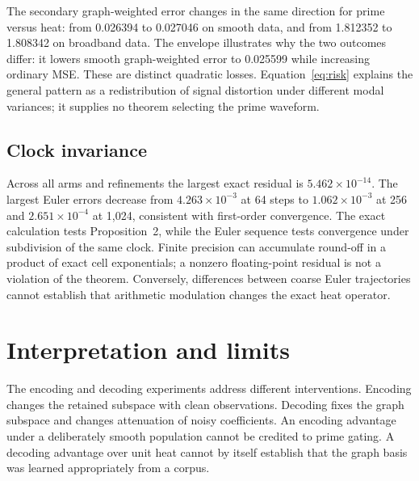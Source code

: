 \documentclass[10pt]{article}
\begin{document}
The secondary graph-weighted error changes in the same direction
for prime versus heat: from 0.026394 to 0.027046 on smooth data,
and from 1.812352 to 1.808342 on broadband data. The envelope illustrates
why the two outcomes differ: it lowers smooth graph-weighted error
to 0.025599 while increasing ordinary MSE. These are distinct quadratic
losses. Equation~\eqref{eq:risk} explains the general pattern as a
redistribution of signal distortion under different modal variances;
it supplies no theorem selecting the prime waveform.

\subsection{Clock invariance}

\begin{table}[htbp]
 \centering\small
 
 \caption{Maximum transfer-function errors relative to exact unit-time
 heat evolution. Each entry is the maximum across all prescribed clock
 arms at that resolution; exact evolution and Euler use the same cells.}
 \label{tab:clock}
\end{table}

Across all arms and refinements the largest exact residual is
$5.462\times10^{-14}$. The largest Euler errors decrease from
$4.263\times10^{-3}$ at 64 steps to $1.062\times10^{-3}$ at 256
and $2.651\times10^{-4}$ at 1,024, consistent with first-order
convergence. The exact calculation tests Proposition~2, while the Euler sequence
tests convergence under subdivision of the same clock. Finite
precision can accumulate round-off in a product of exact cell
exponentials; a nonzero floating-point residual is not a violation of
the theorem. Conversely, differences between coarse Euler trajectories
cannot establish that arithmetic modulation changes the exact heat
operator.

\section{Interpretation and limits}
\label{sec:limits}

The encoding and decoding experiments address different interventions.
Encoding changes the retained subspace with clean observations.
Decoding fixes the graph subspace and changes attenuation of noisy
coefficients. An encoding advantage under a deliberately smooth
population cannot be credited to prime gating. A decoding advantage
over unit heat cannot by itself establish that the graph basis was
learned appropriately from a corpus.
\end{document}

